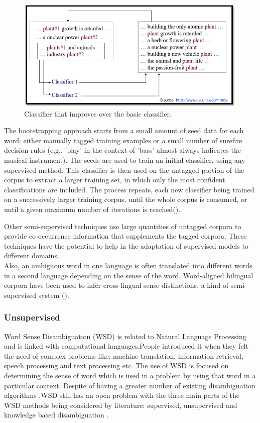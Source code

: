 \begin{figure}[tbh]
	\begin{center}
		\includegraphics[width=\columnwidth]{union(semi)}
	\end{center}
	\caption{Classifier that improves over the basic classifier. \label{fig3}}
\end{figure}

The bootstrapping approach starts from a small amount of seed data for each word: either manually tagged training examples or a small number of surefire decision rules (e.g., 'play' in the context of 'bass' almost always indicates the musical instrument). The seeds are used to train an initial classifier, using any supervised method. This classifier is then used on the untagged portion of the corpus to extract a larger training set, in which only the most confident classifications are included. The process repeats, each new classifier being trained on a successively larger training corpus, until the whole corpus is consumed, or until a given maximum number of iterations is reached(\cite{Blascheck2016}).

Other semi-supervised techniques use large quantities of untagged corpora to provide co-occurrence information that supplements the tagged corpora. These techniques have the potential to help in the adaptation of supervised models to different domains.\\
Also, an ambiguous word in one language is often translated into different words in a second language depending on the sense of the word. Word-aligned bilingual corpora have been used to infer cross-lingual sense distinctions, a kind of semi-supervised system (\cite{Cheslow2014}).

\subsubsection*{Unsupervised}
Word Sense Disambiguation (WSD) is related to Natural Language Processing and is linked with computational languages.People introduced it when they felt the need of complex problems like: machine translation, information retrieval, speech processing and text processing etc. The use of WSD is focused on determining the sense of word which is used in a problem by using that word in a particular context. Despite of having a greater number of existing disambiguation algorithms ,WSD still has an open problem with the three main parts of the WSD methods being considered by literature: supervised, unsupervised and knowledge based disambiguation \cite{Guenther200312}.

